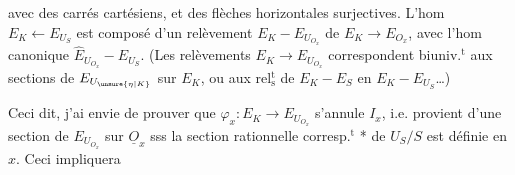 avec des carrés cartésiens, et des flèches horizontales surjectives. L'hom $E_K\longleftarrow E_{U_S}$ est composé d'un relèvement $E_K-E_{U_{O_x}}$ de $E_K\longrightarrow E_{O_x}$, avec l'hom canonique $\widehat E_{U_{O_x}}-E_{U_S}$. (Les  relèvements $E_K\longrightarrow E_{U_{O_x}}$ correspondent biuniv.$^{\mathrm t}$ aux sections de $E_{U_{\unsure{\eta|K}}}$ sur $E_K$, ou aux rel$^{\mathrm t}_{\mathrm s}$ de $E_K-E_S$ en $E_K-E_{U_S}$\ldots)

Ceci dit, j'ai envie de prouver que $\varphi_x:E_K\longrightarrow E_{U_{O_x}}$ s'annule  $I_x$, i.e. provient d'une section de $E_{U_{O_x}}$ sur $\underline O_x$ sss la section rationnelle corresp.$^{\mathrm t}$ * de $U_S/S$ est définie en $x$. Ceci impliquera
